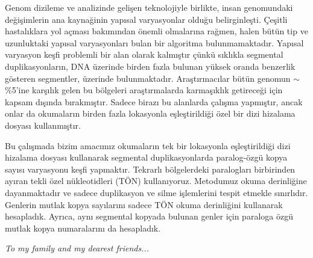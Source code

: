 \documentclass{buthesis}
\begin{document}
\begin{ozet}
Genom dizileme ve analizinde geli\c{s}en teknolojiyle birlikte, insan genomundaki de\u{g}i\c{s}imlerin ana kayna\u{g}inin yap{\i}sal varyasyonlar oldu\u{g}u belirginle\c{s}ti. \c{C}e\c{s}itli hastal{\i}klara yol a\c{c}mas{\i} bak{\i}m{\i}ndan \"{o}nemli olmalar{\i}na ra\u{g}men, halen b\"{u}t\"{u}n tip ve uzunluktaki yap{\i}sal varyasyonlar{\i} bulan bir algoritma bulunmamaktad{\i}r. Yap{\i}sal varyasyon ke\c{s}fi problemli bir alan olarak kalm{\i}\c{s}t{\i}r \c{c}\"{u}nk\"{u} s{\i}kl{\i}kla segmental duplikasyonlar{\i}n, DNA \"{u}zerinde birden fazla bulunan y\"{u}ksek oranda benzerlik g\"{o}steren segmentler, \"{u}zerinde bulunmaktad{\i}r. Ara\c{s}t{\i}rmac{\i}lar b\"{u}t\"{u}n genomun $\sim$\%5'ine kar\c{s}{\i}l{\i}k gelen bu b\"{o}lgeleri ara\c{s}t{\i}rmalarda karma\c{s}{\i}kl{\i}k getirece\u{g}i i\c{c}in kapsam d{\i}\c{s}{\i}nda b{\i}rakm{\i}\c{s}t{\i}r. Sadece biraz{\i} bu alanlarda \c{c}al{\i}\c{s}ma yapm{\i}\c{s}t{\i}r, ancak onlar da okumalar{\i}n birden fazla lokasyonla e\c{s}le\c{s}tirildi\u{g}i \"{o}zel bir dizi hizalama dosyas{\i} kullanm{\i}\c{s}t{\i}r.

Bu \c{c}al{\i}\c{s}mada bizim amac{\i}m{\i}z okumalar{\i}n tek bir lokasyonla e\c{s}le\c{s}tirildi\u{g}i dizi hizalama dosyas{\i} kullanarak segmental duplikasyonlarda paralog-\"{o}zg\"{u} kopya say{\i}s{\i} varyasyonu ke\c{s}fi yapmakt{\i}r. Tekrarl{\i} b\"{o}lgelerdeki paraloglar{\i} birbirinden ay{\i}ran tekli \"{o}zel n\"{u}kleotidleri (T\"{O}N) kullan{\i}yoruz. Metodumuz okuma derinli\u{g}ine dayanmaktad{\i}r ve sadece duplikasyon ve silme i\c{s}lemlerini tespit etmekle s{\i}n{\i}rl{\i}d{\i}r. Genlerin mutlak kopya say{\i}lar{\i}n{\i} sadece T\"{O}N okuma derinli\u{g}ini kullanarak hesaplad{\i}k. Ayr{\i}ca, ayn{\i} segmental kopyada bulunan genler i\c{c}in paraloga \"{o}zg\"{u} mutlak kopya numaralar{\i}n{\i} da hesaplad{\i}k.
\end{ozet}

\clearpage
\begin{center}
    \thispagestyle{empty}
    \vspace*{\fill}
    \textit{To my family and my dearest friends...}
    \vspace*{\fill}
\end{center}
\clearpage

\tableofcontents
\listoffigures
\listoftables
\listofalgorithms
\newpage
\newpage
%
\newpage 
\pagestyle{headings}
\makeatother
\end{document}
